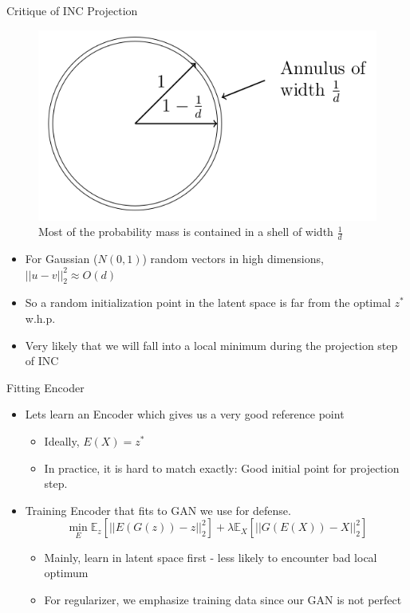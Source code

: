 \documentclass[10pt]{beamer}
\begin{document}
\begin{frame}{Critique of INC Projection}

\begin{figure}[H]
    \caption{Most of the probability mass is contained in a shell of width $\frac{1}{d}$}
    \centering
    \includegraphics[scale=0.3]{./shell.png}
\end{figure}
    \begin{itemize}
        \item For Gaussian ($N(0, 1)$) random vectors in high dimensions, $||u - v||_2^2 \approx O(d)$ \cite{foundations}
        \item So a random initialization point in the latent space is far from the optimal $z^*$ w.h.p.
        \item Very likely that we will fall into a local minimum during the projection step of INC
    \end{itemize}
\end{frame}

\begin{frame}[fragile]{Fitting Encoder}
    \begin{itemize}
        \item Lets learn an Encoder which gives us a very good reference point
        \begin{itemize}
            \item Ideally, $E(X) = z^*$
            \item In practice, it is hard to match exactly: Good initial point for projection step.
        \end{itemize}
        
        \item Training Encoder that fits to GAN we use for defense.
        \begin{equation*}
            \min_{E} \mathbb{E}_{z} [||E(G(z)) - z||_2^2] + \lambda \mathbb{E}_{X} [||G(E(X)) - X||_2^2]
        \end{equation*}
        \begin{itemize}
            \item Mainly, learn in latent space first - less likely to encounter bad local optimum
            \item For regularizer, we emphasize training data since our GAN is not perfect
        \end{itemize}
    \end{itemize}
\end{frame}
\end{document}

